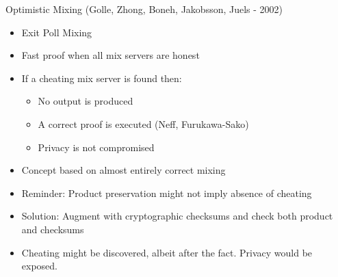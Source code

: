 \documentclass{beamer}
\begin{document}
\begin{frame}[allowframebreaks]{Optimistic Mixing (Golle, Zhong, Boneh, Jakobsson, Juels - 2002)}

\begin{itemize}
\item Exit Poll Mixing
\item Fast proof when all mix servers are honest
\item If a cheating mix server is found then:
\begin{itemize}
	\item No output is produced
	\item A correct proof is executed (Neff, Furukawa-Sako)
	\item Privacy is not compromised
\end{itemize}
\item Concept based on almost entirely correct mixing
\item Reminder: Product preservation might not imply absence of cheating
\item Solution: Augment with cryptographic checksums and check both product and checksums
\item Cheating might be discovered, albeit after the fact. Privacy would be exposed.
\end{itemize}

\framebreak


\end{frame}
\end{document}
